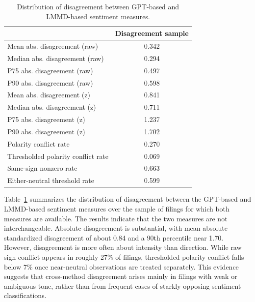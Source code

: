\begin{table}[!htbp]
\caption{Distribution of disagreement between GPT-based and LMMD-based sentiment measures.}
\label{tab:disagreement_summary}
\begin{tabular}{lc}
\toprule
 & Disagreement sample \\
\midrule
Mean abs. disagreement (raw) & 0.342 \\
Median abs. disagreement (raw) & 0.294 \\
P75 abs. disagreement (raw) & 0.497 \\
P90 abs. disagreement (raw) & 0.598 \\
\midrule
Mean abs. disagreement (z) & 0.841 \\
Median abs. disagreement (z) & 0.711 \\
P75 abs. disagreement (z) & 1.237 \\
P90 abs. disagreement (z) & 1.702 \\
\midrule
Polarity conflict rate & 0.270 \\
Thresholded polarity conflict rate & 0.069 \\
Same-sign nonzero rate & 0.663 \\
Either-neutral threshold rate & 0.599 \\
\bottomrule
\end{tabular}
\end{table}

Table~\ref{tab:disagreement_summary} summarizes the distribution of disagreement between the GPT-based and LMMD-based sentiment measures over the sample of filings for which both measures are available. The results indicate that the two measures are not interchangeable. Absolute disagreement is substantial, with mean absolute standardized disagreement of about 0.84 and a 90th percentile near 1.70. However, disagreement is more often about intensity than direction. While raw sign conflict appears in roughly 27\% of filings, thresholded polarity conflict falls below 7\% once near-neutral observations are treated separately. This evidence suggests that cross-method disagreement arises mainly in filings with weak or ambiguous tone, rather than from frequent cases of starkly opposing sentiment classifications.

